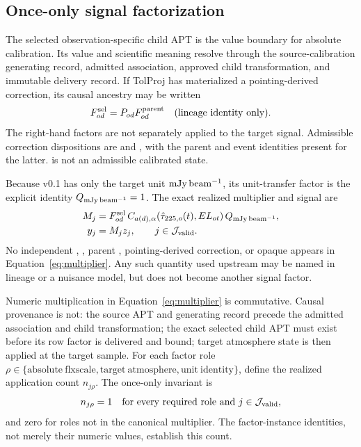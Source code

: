 \subsection{Once-only signal factorization}
\label{sec:factor-equations}

The selected observation-specific child APT is the value boundary for
absolute calibration. Its value and scientific meaning resolve through the
source-calibration generating record, admitted association, approved child
transformation, and immutable delivery record. If TolProj has materialized a
pointing-derived correction, its causal ancestry may be written
\begin{equation}
  F^{\rm sel}_{od}=P_{od}F^{\rm parent}_{od}
  \quad\text{(lineage identity only)}.
  \label{eq:embodied-pointing}
\end{equation}
The right-hand factors are not separately applied to the target signal.
Admissible correction dispositions are  and
, with the parent and event identities present for the
latter.  is not an admissible calibrated state.

Because v0.1 has only the target unit \(\mathrm{mJy\,beam^{-1}}\), its unit-transfer factor is
the explicit identity \(Q_{\mathrm{mJy\,beam^{-1}}}=1\). The exact realized multiplier and
signal are
\begin{align}
 M_j &= F^{\rm sel}_{od}\,C_{a(d),\alpha}(\hat\tau_{225,o}(t),EL_{ot})\,Q_{\mathrm{mJy\,beam^{-1}}},
 \label{eq:multiplier}\\
 y_j &= M_j z_j,\qquad j\in\mathcal{J}_{\mathrm{valid}}.
 \label{eq:signal}
\end{align}
No independent , , parent ,
pointing-derived correction, or opaque  appears in
Equation~\eqref{eq:multiplier}. Any such quantity used upstream may be named in
lineage or a nuisance model, but does not become another signal factor.

Numeric multiplication in Equation~\eqref{eq:multiplier} is commutative.
Causal provenance is not: the source APT and generating record precede the
admitted association and child transformation; the exact selected child APT
must exist before its row factor is delivered and bound; target atmosphere
state is then applied at the target sample. For each
factor role \(\rho\in\{\mathrm{absolute\ flxscale},
\mathrm{target\ atmosphere},\mathrm{unit\ identity}\}\), define the realized
application count \(n_{j\rho}\). The once-only invariant is
\begin{equation}
  n_{j\rho}=1\quad\text{for every required role and }j\in\mathcal{J}_{\mathrm{valid}},
  \label{eq:once-only}
\end{equation}
and zero for roles not in the canonical multiplier. The factor-instance
identities, not merely their numeric values, establish this count.

